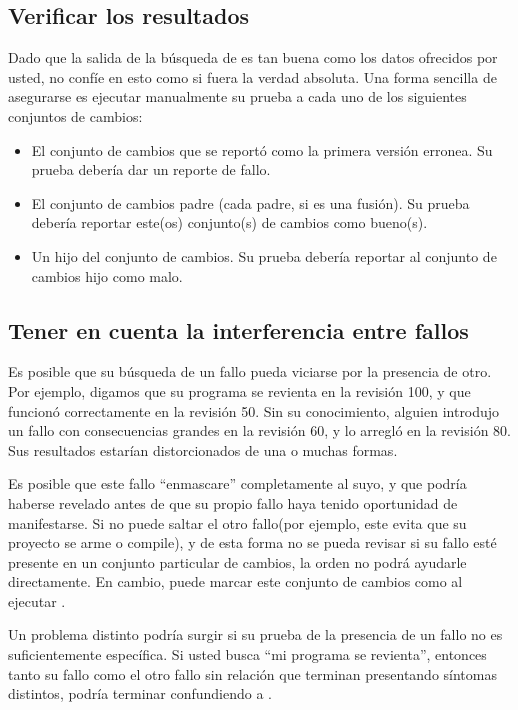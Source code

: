 \subsection{Verificar los resultados}

Dado que la salida de la búsqueda de  es tan buena como
los datos ofrecidos por usted, no confíe en esto como si fuera la
verdad absoluta. Una forma sencilla de asegurarse es ejecutar
manualmente su prueba a cada uno de los siguientes conjuntos de
cambios:
\begin{itemize}
\item El conjunto de cambios que se reportó como la primera versión
  erronea. Su prueba debería dar un reporte de fallo.
\item El conjunto de cambios padre (cada padre, si es una fusión).
  Su prueba debería reportar este(os) conjunto(s) de cambios como
  bueno(s).
\item Un hijo del conjunto de cambios. Su prueba debería reportar al
  conjunto de cambios hijo como malo.
\end{itemize}

\subsection{Tener en cuenta la interferencia entre fallos}

Es posible que su búsqueda de un fallo pueda viciarse por la presencia
de otro. Por ejemplo, digamos que su programa se revienta en la
revisión 100, y que funcionó correctamente en la revisión 50.  Sin su
conocimiento, alguien introdujo un fallo con consecuencias grandes en
la revisión 60, y lo arregló en la revisión 80. Sus resultados
estarían distorcionados de una o muchas formas.

Es posible que este fallo ``enmascare'' completamente al suyo, y que
podría haberse revelado antes de que su propio fallo haya tenido
oportunidad de manifestarse. Si no puede saltar el otro fallo(por
ejemplo, este evita que su proyecto se arme o compile), y de esta
forma no se pueda revisar si su fallo esté presente en un conjunto
particular de cambios, la orden  no podrá ayudarle
directamente. En cambio, puede marcar este conjunto de cambios como
al ejecutar .

Un problema distinto podría surgir si su prueba de la presencia de un
fallo no es suficientemente específica. Si usted busca ``mi programa
se revienta'', entonces tanto su fallo como el otro fallo sin relación
que terminan presentando síntomas distintos, podría terminar
confundiendo a .

